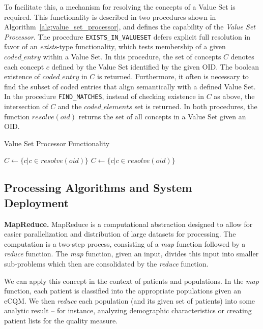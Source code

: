 \documentclass{amia}
\begin{document}
To facilitate this, a mechanism for resolving the concepts of a Value Set is required. This functionality is described in two procedures shown in Algorithm~\ref{alg:value_set_processor}, and defines the capability of the \textit{Value Set Processor}. The procedure \texttt{EXISTS\_IN\_VALUESET} defers explicit full resolution in favor of an \textit{exists}-type functionality, which tests membership of a given $coded\_entry$ within a Value Set. In this procedure, the set of concepts $C$ denotes each concept $c$ defined by the Value Set identified by the given OID. The boolean existence of $coded\_entry$ in $C$ is returned. Furthermore, it often is necessary to find the subset of coded entries that align semantically with a defined Value Set. In the procedure \texttt{FIND\_MATCHES}, instead of checking existence in $C$ as above, the intersection of $C$ and the $coded\_elements$ set is returned. In both procedures, the function $resolve(oid)$ returns the set of all concepts in a Value Set given an OID. 

\begin{algorithm}[H]
\caption{Value Set Processor Functionality}
\label{alg:value_set_processor}
\begin{algorithmic}[1]
  \State $C \gets \{c | c \in resolve(oid)\}$
  \State {}
\EndProcedure
{}
  \State $C \gets \{c | c \in resolve(oid)\}$
  \State {}
\EndProcedure
\end{algorithmic}
\end{algorithm}
  

\subsection{Processing Algorithms and System Deployment}
\textbf{MapReduce.}
MapReduce is a computational abstraction designed to allow for easier parallelization and distribution of large datasets for processing\cite{dean2008mapreduce}. The computation is a two-step process, consisting of a \textit{map} function followed by a \textit{reduce} function. The \textit{map} function, given an input, divides this input into smaller sub-problems which then are consolidated by the \textit{reduce} function. 

We can apply this concept in the context of patients and populations. In the \textit{map} function, each patient is classified into the appropriate populations given an eCQM. We then \textit{reduce} each population (and its given set of patients) into some analytic result -- for instance, analyzing demographic characteristics or creating patient lists for the quality measure.
\end{document}
